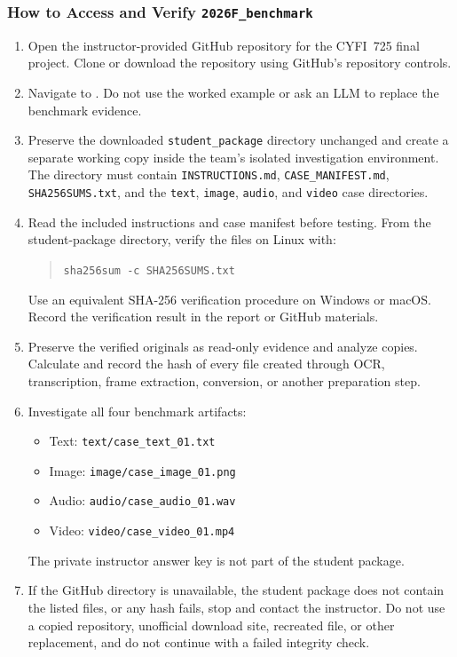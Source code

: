 \documentclass[12pt,letterpaper]{article}
\begin{document}
\subsubsection{How to Access and Verify \texttt{2026F\_benchmark}}
\begin{enumerate}
    \item Open the instructor-provided GitHub repository for the CYFI~725 final project. Clone or download the repository using GitHub's repository controls.
    \item Navigate to . Do not use the worked example or ask an LLM to replace the benchmark evidence.
    \item Preserve the downloaded \texttt{student\_package} directory unchanged and create a separate working copy inside the team's isolated investigation environment. The directory must contain \texttt{INSTRUCTIONS.md}, \texttt{CASE\_MANIFEST.md}, \texttt{SHA256SUMS.txt}, and the \texttt{text}, \texttt{image}, \texttt{audio}, and \texttt{video} case directories.
    \item Read the included instructions and case manifest before testing. From the student-package directory, verify the files on Linux with:
          \begin{quote}
              \texttt{sha256sum -c SHA256SUMS.txt}
          \end{quote}
          Use an equivalent SHA-256 verification procedure on Windows or macOS. Record the verification result in the report or GitHub materials.
    \item Preserve the verified originals as read-only evidence and analyze copies. Calculate and record the hash of every file created through OCR, transcription, frame extraction, conversion, or another preparation step.
    \item Investigate all four benchmark artifacts:
          \begin{itemize}
              \item Text: \texttt{text/case\_text\_01.txt}
              \item Image: \texttt{image/case\_image\_01.png}
              \item Audio: \texttt{audio/case\_audio\_01.wav}
              \item Video: \texttt{video/case\_video\_01.mp4}
          \end{itemize}
          The private instructor answer key is not part of the student package.
    \item If the GitHub directory is unavailable, the student package does not contain the listed files, or any hash fails, stop and contact the instructor. Do not use a copied repository, unofficial download site, recreated file, or other replacement, and do not continue with a failed integrity check.
\end{enumerate}
\end{document}
